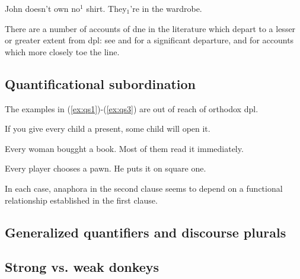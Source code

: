 \documentclass[nols,twoside,nofonts,nobib,nohyper]{tufte-handout}
\theoremstyle{definition}
\begin{document}
\ex
John doesn't own no$^{1}$ shirt. They$_{1}$'re in the wardrobe.
\xe

There are a number of accounts of \ac{dne} in the literature which depart to a lesser or greater extent from \ac{dpl}: see \cite{Rothschild2017} and \cite{Mandelkern2020a,Mandelkern2020b} for a significant departure, and \cite{KrahmerMuskens1995,Gotham2019,Elliott2020b} for accounts which more closely toe the line.

\subsection{Quantificational subordination}

The examples in (\ref{ex:qs1})-(\ref{ex:qs3}) are out of reach of orthodox \ac{dpl}.

\ex
If you give every child a present, some child will open it.\label{ex:qs1}
\xe

\ex
Every woman bougght a book. Most of them read it immediately.\label{ex:qs2}
\xe

\ex
Every player chooses a pawn. He puts it on square one.\label{ex:qs3}
\xe

In each case, anaphora in the second clause seems to depend on a functional relationship established in the first clause.

\subsection{Generalized quantifiers and discourse plurals}

\subsection{Strong vs. weak donkeys}


\citet{Kanazawa1994}

\printbibliography
\end{document}
